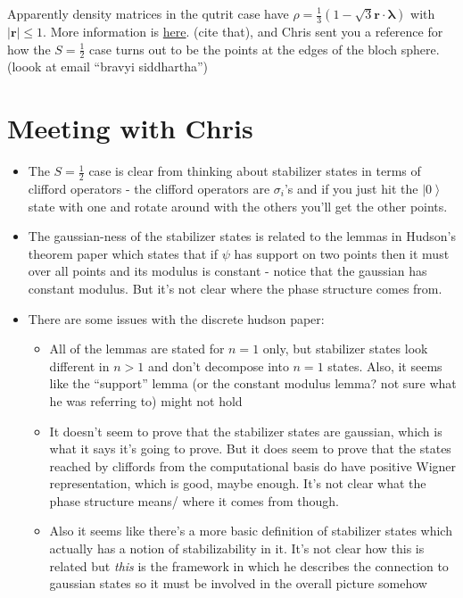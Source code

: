 \documentclass{report}
\begin{document}
 Apparently density matrices in the qutrit case have $\rho=\frac{1}{3}(1-\sqrt{3}\bm{r}\cdot \bm{\lambda})$ with $|\bm r|\leq 1$. More information is \href{http://home.lu.lv/~sd20008/papers/Bloch%20Vectors%20and%20Eigenvalues.pdf}{here}. (\todo cite that), and Chris sent you a reference for how the $S=\frac{1}{2}$ case turns out to be the points at the edges of the bloch sphere. (\todo loook at email ``bravyi siddhartha'')
 
 \section{Meeting with Chris}
 
 \begin{itemize}
 \item The $S=\frac{1}{2}$ case is clear from thinking about stabilizer states in terms of clifford operators - the clifford operators are $\sigma_i$'s and if you just hit the $\left| 0\right>$ state with one and rotate around with the others you'll get the other points.
 \item The gaussian-ness of the stabilizer states is related to the lemmas in Hudson's theorem paper which states that if $\psi$ has support on two points then it must over all points and its modulus is constant - notice that the gaussian has constant modulus. But it's not clear where the phase structure comes from. 
 \item There are some issues with the discrete hudson paper:
 	\begin{itemize}
 	\item All of the lemmas are stated for $n=1$ only, but stabilizer states look different in $n>1$ and don't decompose into $n=1$ states. Also, it seems like the ``support'' lemma (or the constant modulus lemma? not sure what he was referring to) might not hold
 	\item It doesn't seem to prove that the stabilizer states are gaussian, which is what it says it's going to prove. But it does seem to prove that the states reached by cliffords from the computational basis do have positive Wigner representation, which is good, maybe enough. It's not clear what the phase structure means/ where it comes from though. 
 	\item Also it seems like there's a more basic definition of stabilizer states which actually has a notion of stabilizability in it. It's not clear how this is related but \textit{this} is the framework in which he describes the connection to gaussian states so it must be involved in the overall picture somehow

\end{itemize}
\end{itemize}
\end{document}
